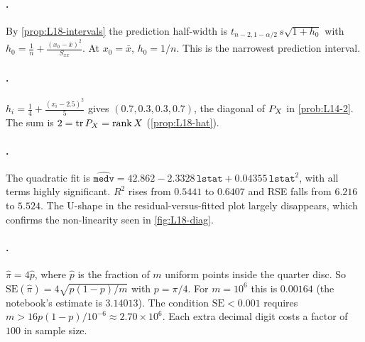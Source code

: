 \paragraph{.}
By \cref{prop:L18-intervals} the prediction half-width is $t_{n-2,1-\alpha/2}\,s\sqrt{1+h_0}$ with
$h_0=\frac1n+\frac{(x_0-\bar x)^2}{S_{xx}}$. At $x_0=\bar x$, $h_0=1/n$. This is the narrowest prediction interval.

\paragraph{.}
$h_i=\frac14+\frac{(x_i-2.5)^2}{5}$ gives $(0.7,0.3,0.3,0.7)$, the diagonal of $P_X$ in \cref{prob:L14-2}. The sum is
$2=\operatorname{tr}P_X=\operatorname{rank} X$ (\cref{prop:L18-hat}).

\paragraph{.}
The quadratic fit is $\widehat{\texttt{medv}}=42.862-2.3328\,\texttt{lstat}+0.04355\,\texttt{lstat}^2$, with all terms highly
significant. $R^2$ rises from $0.5441$ to $0.6407$ and RSE falls from $6.216$ to $5.524$. The U-shape in the
residual-versus-fitted plot largely disappears, which confirms the non-linearity seen in \cref{fig:L18-diag}.

\paragraph{.}
$\hat\pi=4\hat p$, where $\hat p$ is the fraction of $m$ uniform points inside the quarter disc. So
$\mathrm{SE}(\hat\pi)=4\sqrt{p(1-p)/m}$ with $p=\pi/4$. For $m=10^6$ this is $0.00164$ (the notebook's estimate is $3.14013$).
The condition $\mathrm{SE}<0.001$ requires $m>16p(1-p)/10^{-6}\approx2.70\times10^6$. Each extra decimal digit costs a factor of $100$ in
sample size.
